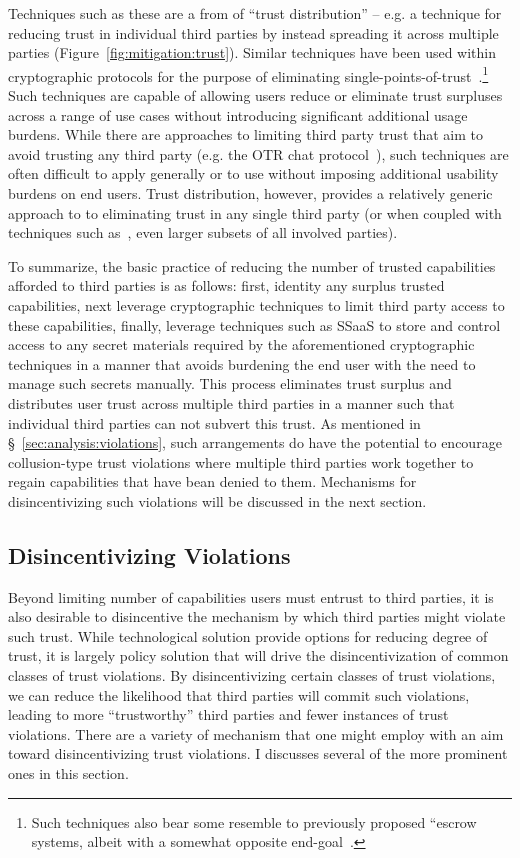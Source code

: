 Techniques such as these are a from of ``trust distribution'' --
e.g. a technique for reducing trust in individual third parties by
instead spreading it across multiple parties
(Figure~\ref{fig:mitigation:trust}). Similar techniques have been used
within cryptographic protocols for the purpose of eliminating
single-points-of-trust~\cite{shamir1979}.\footnote{Such techniques
  also bear some resemble to previously proposed ``escrow systems,
  albeit with a somewhat opposite end-goal~\cite{denning1996}.} Such
techniques are capable of allowing users reduce or eliminate trust
surpluses across a range of use cases without introducing significant
additional usage burdens. While there are approaches to limiting third
party trust that aim to avoid trusting any third party (e.g. the OTR
chat protocol~\cite{otr-v3}), such techniques are often difficult to
apply generally or to use without imposing additional usability
burdens on end users. Trust distribution, however, provides a
relatively generic approach to to eliminating trust in any single
third party (or when coupled with techniques such
as~\cite{shamir1979}, even larger subsets of all involved parties).

To summarize, the basic practice of reducing the number of trusted
capabilities afforded to third parties is as follows: first, identity
any surplus trusted capabilities, next leverage cryptographic
techniques to limit third party access to these capabilities, finally,
leverage techniques such as SSaaS to store and control access to any
secret materials required by the aforementioned cryptographic
techniques in a manner that avoids burdening the end user with the
need to manage such secrets manually. This process eliminates trust
surplus and distributes user trust across multiple third parties in a
manner such that individual third parties can not subvert this
trust. As mentioned in \S~\ref{sec:analysis:violations}, such
arrangements do have the potential to encourage collusion-type trust
violations where multiple third parties work together to regain
capabilities that have bean denied to them. Mechanisms for
disincentivizing such violations will be discussed in the next
section.

\subsection{Disincentivizing Violations}
\label{sec:mitigation:violations}

Beyond limiting number of capabilities users must entrust to third
parties, it is also desirable to disincentive the mechanism by which
third parties might violate such trust.  While technological solution
provide options for reducing degree of trust, it is largely policy
solution that will drive the disincentivization of common classes of
trust violations. By disincentivizing certain classes of trust
violations, we can reduce the likelihood that third parties will
commit such violations, leading to more ``trustworthy'' third parties
and fewer instances of trust violations. There are a variety of
mechanism that one might employ with an aim toward disincentivizing
trust violations. I discusses several of the more prominent ones in
this section.

